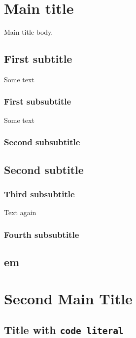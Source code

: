 \chapter{Main title}
Main title body.

\section{First subtitle}
Some text

\subsection{First subsubtitle}
Some text


\subsection{Second subsubtitle}



\section{Second subtitle}

\subsection{Third subsubtitle}
Text again


\subsection{Fourth subsubtitle}



\section{em}



\chapter{Second Main Title}

\section{Title with \verb|code literal|}
